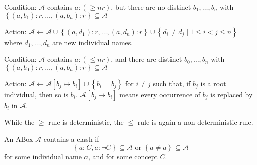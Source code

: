 \begin{mdframed}[frametitle= The $ \geq$-rule]
	Condition: $\mathcal{A}$ contains $a:( \geq nr)$, but there are no distinct
	$b_1, \ldots, b_n$ with $\left\{ (a,b_1):r, \ldots, (a,b_n):r \right\} \subseteq \mathcal{A}$

	Action: $\mathcal{A} \leftarrow \mathcal{A} \cup \left\{ (a,d_1):r, \ldots, (a,d_n):r \right\} \cup \left\{ d_i \neq d_j \mid 1 \leq i < j \leq n \right\}$
	where $d_1, \ldots, d_n$ are new individual names.
\end{mdframed}
\begin{mdframed}[frametitle= The $ \leq$-rule, nobreak = true]
	Condition: $\mathcal{A}$ contains $a:( \leq nr)$, and there are distinct
	$b_0, \ldots, b_n$ with $\left\{ (a,b_0):r, \ldots, (a,b_n):r \right\} \subseteq \mathcal{A}$

	Action: $\mathcal{A} \leftarrow \mathcal{A}[b_j \mapsto b_i] \cup \left\{ b_i = b_j \right\}$
	for $i \neq j$ such that, if $b_j$ is a root individual, then so is $b_i$.
	$\mathcal{A}[b_j \mapsto b_i]$ means every occurrence of $b_j$ is replaced by $b_i$ in $\mathcal{A}$.
\end{mdframed}
\begin{note}
	While the $ \geq$-rule is deterministic, the $ \leq$-rule is again a non-deterministic rule.
\end{note}
\begin{mdframed}[frametitle= The new clash]
An ABox $\mathcal{A}$ contains a clash if
\[
\left\{ a:C, a: \neg C \right\} \subseteq \mathcal{A} \text{ or } \left\{ a \neq a \right\} \subseteq \mathcal{A}
\]
for some individual name $a$, and for some concept $C$.
\end{mdframed}

